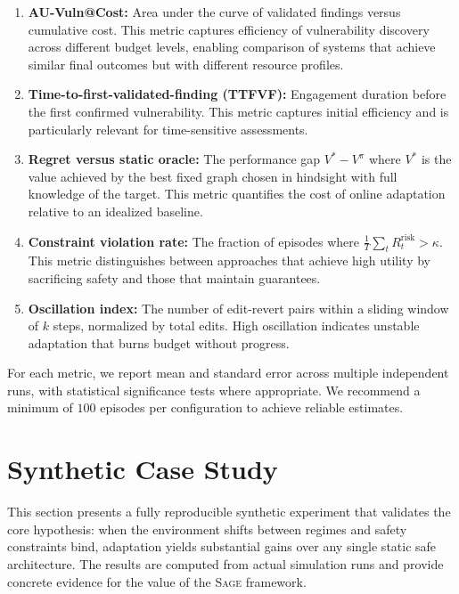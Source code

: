 \documentclass[sigconf,anonymous]{acmart}
\newcommand{\SAGE}{\textsc{Sage}\xspace}
\begin{document}
\begin{enumerate}
\item \textbf{AU-Vuln@Cost:} Area under the curve of validated findings versus cumulative cost. This metric captures efficiency of vulnerability discovery across different budget levels, enabling comparison of systems that achieve similar final outcomes but with different resource profiles.

\item \textbf{Time-to-first-validated-finding (TTFVF):} Engagement duration before the first confirmed vulnerability. This metric captures initial efficiency and is particularly relevant for time-sensitive assessments.

\item \textbf{Regret versus static oracle:} The performance gap $V^* - V^\pi$ where $V^*$ is the value achieved by the best fixed graph chosen in hindsight with full knowledge of the target. This metric quantifies the cost of online adaptation relative to an idealized baseline.

\item \textbf{Constraint violation rate:} The fraction of episodes where $\frac{1}{T}\sum_t R_t^{\text{risk}} > \kappa$. This metric distinguishes between approaches that achieve high utility by sacrificing safety and those that maintain guarantees.

\item \textbf{Oscillation index:} The number of edit-revert pairs within a sliding window of $k$ steps, normalized by total edits. High oscillation indicates unstable adaptation that burns budget without progress.
\end{enumerate}

For each metric, we report mean and standard error across multiple independent runs, with statistical significance tests where appropriate. We recommend a minimum of $100$ episodes per configuration to achieve reliable estimates.

\section{Synthetic Case Study}
\label{sec:casestudy}

This section presents a fully reproducible synthetic experiment that validates the core hypothesis: when the environment shifts between regimes and safety constraints bind, adaptation yields substantial gains over any single static safe architecture. The results are computed from actual simulation runs and provide concrete evidence for the value of the \SAGE framework.
\end{document}
